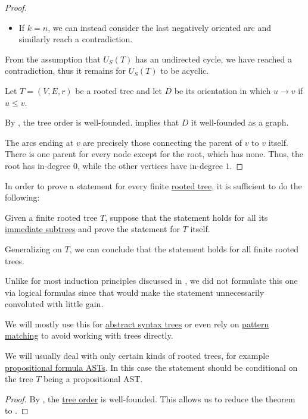 \begin{proof}
\begin{itemize}
    \item If \( k = n \), we can instead consider the last negatively oriented arc and similarly reach a contradiction.
  \end{itemize}

  From the assumption that \( U_S(T) \) has an undirected cycle, we have reached a contradiction, thus it remains for \( U_S(T) \) to be acyclic.

   Let \( T = (V, E, r) \) be a rooted tree and let \( D \) be its orientation in which \( u \to v \) if \( u \leq v \).

   By , the tree order is well-founded.  implies that \( D \) it well-founded as a graph.

   The arcs ending at \( v \) are precisely those connecting the parent of \( v \) to \( v \) itself. There is one parent for every node except for the root, which has none. Thus, the root has in-degree \( 0 \), while the other vertices have in-degree \( 1 \).
\end{proof}

\begin{theorem}\label{thm:induction_on_rooted_trees}\mimprovised
  In order to prove a statement for every finite \hyperref[def:rooted_tree]{rooted tree}, it is sufficient to do the following:
  \begin{displayquote}
    Given a finite rooted tree \( T \), suppose that the statement holds for all its \hyperref[def:rooted_tree/subtree]{immediate subtrees} and prove the statement for \( T \) itself.
  \end{displayquote}

  Generalizing on \( T \), we can conclude that the statement holds for all finite rooted trees.
\end{theorem}
\begin{comments}
  \item Unlike for most induction principles discussed in , we did not formulate this one via logical formulas since that would make the statement unnecessarily convoluted with little gain.

  \item We will mostly use this for \hyperref[con:abstract_syntax_tree]{abstract syntax trees} or even rely on \hyperref[con:evaluation]{pattern matching} to avoid working with trees directly.

  \item We will usually deal with only certain kinds of rooted trees, for example \hyperref[def:propositional_syntax/formula_ast]{propositional formula ASTs}. In this case the statement should be conditional on the tree \( T \) being a propositional AST.
\end{comments}
\begin{proof}
  By , the \hyperref[def:rooted_tree]{tree order} is well-founded. This allows us to reduce the theorem to .
\end{proof}

